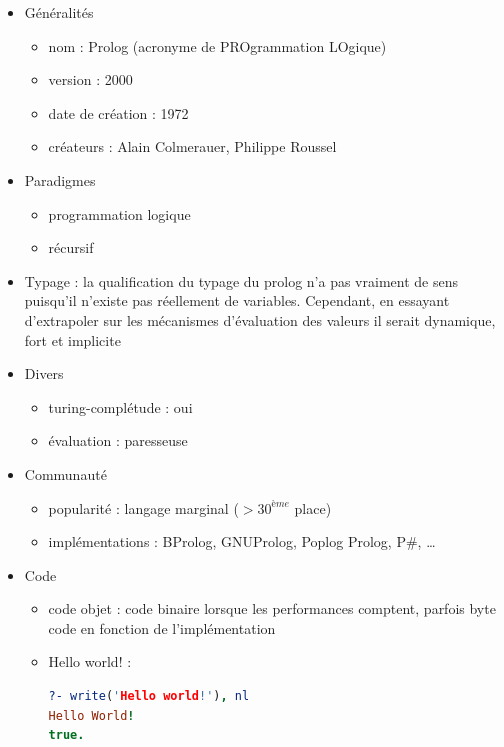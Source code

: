 \renewcommand{\labelitemi}{\textbullet}
\begin{itemize}
\item Généralités
	\begin{itemize}
	\item nom : Prolog (acronyme de PROgrammation LOgique)
	\item version : 2000
	\item date de création : 1972
	\item créateurs : Alain Colmerauer, Philippe Roussel\\
	\end{itemize}
\item Paradigmes
	\begin{itemize}
	\item programmation logique
	\item récursif\\
	\end{itemize}
\item Typage : la qualification du typage du prolog n'a pas vraiment de sens puisqu'il n'existe pas réellement de variables. Cependant, en essayant d'extrapoler sur les mécanismes d'évaluation des valeurs il serait dynamique, fort et implicite\\
\item Divers
	\begin{itemize}
	\item turing-complétude : oui
	\item évaluation : paresseuse\\
	\end{itemize}
\item Communauté
	\begin{itemize}
	\item popularité : langage marginal ($> 30^{ème}$ place)
	\item implémentations : BProlog, GNUProlog, Poplog Prolog, P\#, …\\
	\end{itemize}
\item Code
	\begin{itemize}
	\item code objet : code binaire lorsque les performances comptent, parfois byte code en fonction de l'implémentation
	\item Hello world! :
\begin{lstlisting}[language=prolog]
?- write('Hello world!'), nl
Hello World!
true.
\end{lstlisting}
	\end{itemize}
\end{itemize}

